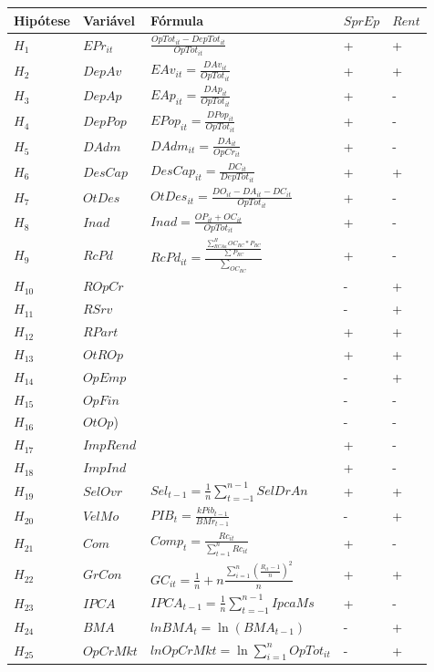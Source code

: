 \documentclass[
  12pt,
  12pt,
  openright,
  oneside,
  a4paper,
  chapter=TITLE,
  section=TITLE,
  subsection=TITLE,
  subsubsection=TITLE,
  portugues,
  sumario=tradicional]{abntex2}
\begin{document}
\begin{longtable}[]{@{}
  >{\centering\arraybackslash}p{}
  >{\centering\arraybackslash}p{}
  >{\centering\arraybackslash}p{}
  >{\centering\arraybackslash}p{}
  >{\centering\arraybackslash}p{}@{}}
\toprule
Hipótese & Variável & Fórmula & \(SprEp\) & \(Rent\) \\
\midrule
\endhead
\(H_{1}\) & \(EPr_{it}\) & \(\frac{OpTot_{it} - DepTot_{it}}{OpTot_{it}}\) & + & + \\
\(H_{2}\) & \(DepAv\) & \(EAv_{it} = \frac{DAv_{it}}{OpTot_{it}}\) & + & + \\
\(H_{3}\) & \(DepAp\) & \(EAp_{it} = \frac{DAp_{it}}{OpTot_{it}}\) & + & - \\
\(H_{4}\) & \(DepPop\) & \(EPop_{it} = \frac{DPop_{it}}{OpTot_{it}}\) & + & - \\
\(H_{5}\) & \(DAdm\) & \(DAdm_{it} = \frac{DA_{it}}{OpCr_{it}}\) & + & - \\
\(H_{6}\) & \(DesCap\) & \(DesCap_{it} = \frac{DC_{it}}{DepTot_{it}}\) & + & + \\
\(H_{7}\) & \(OtDes\) & \(OtDes_{it} = \frac{ DO_{it} - DA_{it} - DC_{it} }{ OpTot_{it} }\) & + & - \\
\(H_{8}\) & \(Inad\) & \(Inad = \frac{ OP_{it} + OC_{it} }{OpTot_{it}}\) & + & - \\
\(H_{9}\) & \(RcPd\) & \(RcPd_{it} = \frac{\frac{\sum_{RCAa}^HOC_{RC}*P_{RC}}{\sum_{}P_{RC}}}{\sum_{OC_{RC}}}\) & + & - \\
\(H_{10}\) & \(ROpCr\) & & - & + \\
\(H_{11}\) & \(RSrv\) & & - & + \\
\(H_{12}\) & \(RPart\) & & + & + \\
\(H_{13}\) & \(OtROp\) & & + & + \\
\(H_{14}\) & \(OpEmp\) & & - & + \\
\(H_{15}\) & \(OpFin\) & & - & - \\
\(H_{16}\) & \(OtOp\)) & & - & - \\
\(H_{17}\) & \(ImpRend\) & & + & - \\
\(H_{18}\) & \(ImpInd\) & & + & - \\
\(H_{19}\) & \(SelOvr\) & \(Sel_{t-1} = \frac{1}{n}\sum_{t=-1}^{n-1}SelDrAn\) & + & + \\
\(H_{20}\) & \(VelMo\) & \(PIB_{t} = \frac{k Pib_{t-1}}{BMr_{t-1}}\) & - & + \\
\(H_{21}\) & \(Com\) & \(Comp_{t} = \frac{Rc_{it}}{\sum_{t=1}^{n}Rc_{it}}\) & + & - \\
\(H_{22}\) & \(GrCon\) & \(GC_{it} = \frac{1}{n} + n\frac{\sum_{i=1}^{n}(\frac{R_{it} - 1}{n})^2}{n}\) & + & + \\
\(H_{23}\) & \(IPCA\) & \(IPCA_{t-1} = \frac{1}{n}\sum_{t=-1}^{n-1}IpcaMs\) & + & - \\
\(H_{24}\) & \(BMA\) & \(lnBMA_{t} = \ln(BMA_{t-1})\) & - & + \\
\(H_{25}\) & \(OpCrMkt\) & \(lnOpCrMkt = \ln\sum_{i = 1}^nOpTot_{it}\) & - & + \\
\bottomrule
\end{longtable}
\end{document}
